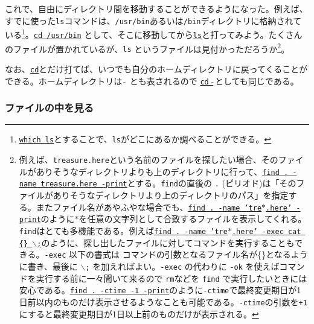 これで、自由にディレクトリ間を移動することができるようになった。例えば、すでに使った{\tt ls}コマンドは、{\tt /usr/bin}あるいは{\tt /bin}ディレクトリに格納されている\footnote{\underline{\tt which ls}とすることで、{\tt ls}がどこにあるか調べることができる。}。\underline{\tt cd /usr/bin} として、そこに移動してから\underline{\tt ls}と打ってみよう。たくさんのファイルが置かれているが、{\tt ls} というファイルは見付かっただろうか\footnote{例えば、{\tt treasure.here}という名前のファイルを探したい場合、そのファイルがありそうなディレクトリよりも上のディレクトリに行って、\underline{\tt find . -name treasure.here -print}とする。{\tt find}の直後の {\tt .} (ピリオド)は「そのファイルがありそうなディレクトリより上のディレクトリのパス」を指定する。またファイル名があやふやな場合でも、\underline{\tt find . -name 'tre$\ast$.here' -print}のように$\ast$を任意の文字列として合致するファイルを表示してくれる。{\tt find}はとても多機能である。例えば\underline{\tt find . -name 'tre$\ast$.here' -exec cat \{\} $\backslash$;}のように、探し出したファイルに対してコマンドを実行することもできる。{\tt -exec} 以下の書式は コマンドの引数となるファイル名が\{\}となるように書き、最後に {\tt $\backslash$;} を加えればよい。{\tt -exec} の代わりに {\tt -ok} を使えばコマンドを実行する前に一々聞いて来るので {\tt rm}などを {\tt find} で実行したいときには安心である。\underline{\tt find\ .\ -ctime -1 -print}のように{\tt -ctime}で最終変更期日が1日前以内のものだけ表示させるようなことも可能である。{\tt -ctime}の引数を{\tt +1} にすると最終変更期日が1日以上前のものだけが表示される。}。

なお、\underline{{\tt cd}}とだけ打てば、いつでも自分のホームディレクトリに戻ってくることができる。ホームディレクトリは $\tilde{\ }$ とも表されるので \underline{{\tt cd $\tilde{\ }$}}としても同じである。

\subsubsection{ファイルの中を見る}

